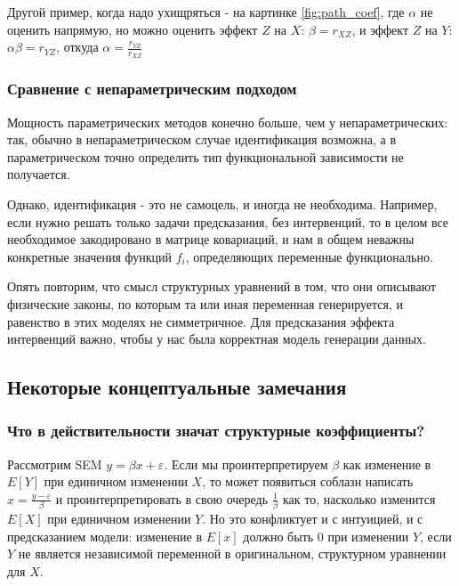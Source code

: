 \documentclass[fleqn]{article}
\numberwithin{equation}{section}
\numberwithin{theorem}{section}
\numberwithin{figure}{section}
\numberwithin{lemma}{section}
\numberwithin{corollary}{section}
\begin{document}
Другой пример, когда надо ухищряться - на картинке \ref{fig:path_coef}, где $\alpha$ не оценить напрямую, но можно оценить эффект $Z$ на $X$: $\beta = r_{XZ}$, и эффект $Z$ на $Y$: $\alpha \beta = r_{YZ}$, откуда $\alpha = \frac{r_{YZ}}{r_{XZ}}$

\subsubsection*{Сравнение с непараметрическим подходом}

Мощность параметрических методов конечно больше, чем у непараметрических: так, обычно в непараметрическом случае идентификация возможна, а в параметрическом точно определить тип функциональной зависимости не получается. 

Однако, идентификация - это не самоцель, и иногда не необходима. Например, если нужно решать только задачи предсказания, без интервенций, то в целом все необходимое закодировано в матрице ковариаций, и нам в общем неважны конкретные значения функций $f_i$, определяющих переменные функционально.

Опять повторим, что смысл структурных уравнений в том, что они описывают физические законы, по которым та или иная переменная генерируется, и равенство в этих моделях не симметричное. Для предсказания эффекта интервенций важно, чтобы у нас была корректная модель генерации данных.

\subsection*{Некоторые концептуальные замечания}

\subsubsection*{Что в действительности значат структурные коэффициенты?}

Рассмотрим SEM $y = \beta x + \varepsilon$. Если мы проинтерпретируем $\beta$ как изменение в $E[Y]$ при единичном изменении $X$, то может появиться соблазн написать $x = \frac{y - \varepsilon}{\beta}$ и проинтерпретировать в свою очередь $\frac{1}{\beta}$ как то, насколько изменится $E[X]$ при единичном изменении $Y$. Но это конфликтует и с интуицией, и с предсказанием модели: изменение в $E[x]$ должно быть 0 при изменении $Y$, если $Y$ не является независимой переменной в оригинальном, структурном уравнении для $X$.
\end{document}
